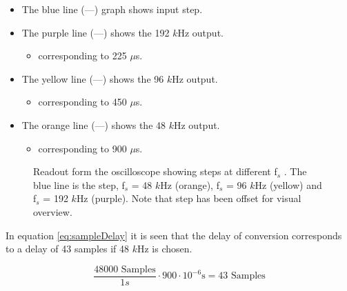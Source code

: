 \begin{itemize}
	\item The blue line (\textcolor{MATLABblue}{---}) graph shows input step.
	\item The purple line (\textcolor{MATLABpurple}{---}) shows the 192 $k$Hz output.
	\begin{itemize}
		\item corresponding to 225 $\mu$s.
	\end{itemize}
	\item The yellow line (\textcolor{MATLAByellow}{---}) shows the 96 $k$Hz output.
	\begin{itemize}
		\item corresponding to 450 $\mu$s.
	\end{itemize}
	\item The orange line (\textcolor{MATLABorange}{---}) shows the 48 $k$Hz output.
	\begin{itemize}
		\item corresponding to 900 $\mu$s.
	\end{itemize}
\end{itemize}
 

\begin{figure}[H]
	\centering
	
	\caption{Readout form the oscilloscope showing steps at different f$_s$ . The blue line is the step, f$_s$ = 48 $k$Hz (orange), f$_s$ = 96 $k$Hz (yellow) and f$_s$ = 192 $k$Hz (purple). Note that step has been offset for visual overview.}
	\label{fig:ScopeDelayExperiment}
\end{figure}

In equation \ref{eq:sampleDelay} it is seen that the delay of conversion corresponds to a delay of 43 samples if 48 $k$Hz is chosen.

\begin{equation}\label{eq:sampleDelay}
	\frac{48000\text{ Samples}}{1s} \cdot 900\cdot 10^{-6}\text{s} = 43 \text{ Samples} 
\end{equation}






